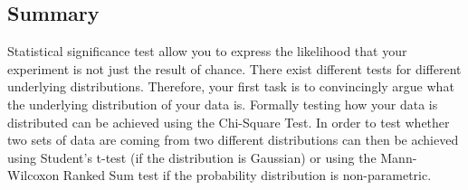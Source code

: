 \subsection{Summary}
Statistical significance test allow you to express the likelihood that your experiment is not just the result of chance. There exist different tests for different underlying distributions. Therefore, your first task is to convincingly argue what the underlying distribution of your data is. Formally testing how your data is distributed can be achieved using the Chi-Square Test. In order to test whether two sets of data are coming from two different distributions can then be achieved using Student's t-test (if the distribution is Gaussian) or using the Mann-Wilcoxon Ranked Sum test if the probability distribution is non-parametric.
